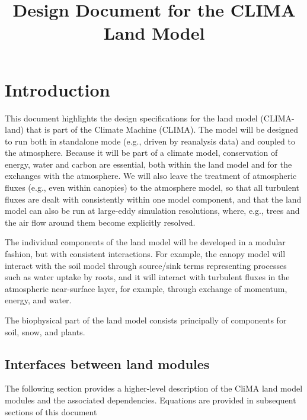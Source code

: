 \documentclass{article}
\title{Design Document for the CLIMA Land Model}
\author{ }
\begin{document}
      
\maketitle
\tableofcontents

\section{Introduction}\label{s:introduction}

This document highlights the design specifications for the land model (CLIMA-land) that is part of the Climate Machine (CLIMA). The model will be designed to run both in standalone mode (e.g., driven by reanalysis data) and coupled to the atmosphere. Because it will be part of a climate model, conservation of energy, water and carbon are essential, both within the land model and for the exchanges with the atmosphere. We will also leave the treatment of atmospheric fluxes (e.g., even within canopies) to the atmosphere model, so that all turbulent fluxes are dealt with consistently within one model component, and that the land model can also be run at large-eddy simulation resolutions, where, e.g., trees and the air flow around them become explicitly resolved. 

The individual components of the land model will be developed in a modular fashion, but with consistent interactions. For example, the canopy model will interact with the soil model through source/sink terms representing processes such as water uptake by roots, and it will interact with turbulent fluxes in the atmospheric near-surface layer, for example, through exchange of momentum, energy, and water. 

The biophysical part of the land model consists principally of components for soil, snow, and plants.
\subsection{Interfaces between land modules}

The following section provides a higher-level description of the CliMA land model modules and the associated dependencies. Equations are provided in subsequent sections of this document

\newpage
\vfill
\end{document}
